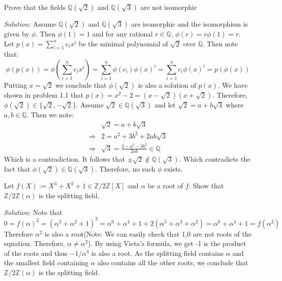 \documentclass[a4paper, 11pt]{article}
\newenvironment{solution}
    {\textit{Solution:}}
    {}
\begin{document}
\begin{tcolorbox}[colback=c2,colframe=c1,title=Problem 2.4]
    Prove that the fields $\mathbb Q(\sqrt2)$ and $\mathbb Q(\sqrt3)$ are not isomorphic
\end{tcolorbox}
\begin{solution}
    Assume $\mathbb Q(\sqrt2)$ and $\mathbb Q(\sqrt3)$ are isomorphic and the isomorphism is given by $\phi$. Then $\phi(1)=1$ and for any rational $r\in\mathbb{Q}$, $\phi(r)=r\phi(1)=r$. Let $p(x)=\sum_{i=1}^nc_ix^i$ be the minimal polynomial of $\sqrt{2}$ over $\mathbb Q$. Then note that:
    $$\phi(p(x))=\phi\left(\sum_{i=1}^nc_ix^i\right)=\sum_{i=1}^n\phi(c_i)\phi(x)^i=\sum_{i=1}^nc_i\phi(x)^i=p\left(\phi(x)\right)$$ 
    Putting $x=\sqrt{2}$ we conclude that $\phi\left(\sqrt2\right)$ is also a solution of $p(x)$. We have shown in problem 1.1 that  $p(x)=x^2-2=(x-\sqrt{2})(x+\sqrt{2})$. Therefore, $\phi(\sqrt{2})\in\{\sqrt{2},-\sqrt{2}\}$. Assume $\sqrt2\in\mathbb Q(\sqrt3)$ and let $\sqrt 2=a+b\sqrt 3$ where $a,b\in\mathbb Q$. Then we note:
    \begin{align*}
        &\sqrt 2=a+b\sqrt 3\\
        \Rightarrow&2=a^2+3b^2+2ab\sqrt3\\
        \Rightarrow&\sqrt3=\frac{3-a^2-3b^2}{2ab}\in\mathbb{Q}
    \end{align*}
    Which is a contradiction. It follows that $\pm\sqrt{2}\notin \mathbb Q(\sqrt{3})$. Which contradicts the fact that $\phi(\sqrt{2})\in\mathbb{Q}(\sqrt{3})$. Therefore, no such $\phi$ exists. 
\end{solution}




\begin{tcolorbox}[colback=c2,colframe=c1,title=Problem 2.5]
    Let $f(X):=X^3+X^2+1\in \mathbb{Z}/2\mathbb{Z}[X]$ and $\alpha$ be a root of $f$. Show that $\mathbb{Z}/2\mathbb{Z}(\alpha)$ is the splitting field.
\end{tcolorbox}
\begin{solution}
    Note that $$0=f(\alpha)^2=(\alpha^3+\alpha^2+1)^2=\alpha^6+\alpha^4+1+2(\alpha^5+\alpha^3+\alpha^2)=\alpha^6+\alpha^4+1=f(\alpha^2)$$
    Therefore $\alpha^2$ is also a root(Note: We can easily check that 1,0 are not roots of the equation. Therefore, $\alpha\ne\alpha^2$). By using Vieta's formula, we get -1 is the product of the roots and thus $-1/\alpha^3$ is also a root. As the splitting field contains $\alpha$ and the smallest field containing $\alpha$ also contains all the other roots, we conclude that  $\mathbb{Z}/2\mathbb{Z}(\alpha)$ is the splitting field.
\end{solution}
\end{document}
